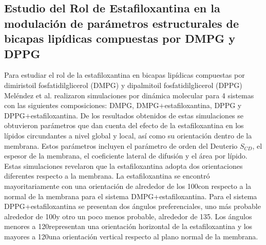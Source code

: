 \subsection{Estudio del Rol de Estafiloxantina en la modulaci\'{o}n de par\'{a}metros estructurales de bicapas lip\'{i}dicas compuestas por DMPG y DPPG  \cite{Melendez-Delgado2018StudyingBilayers}}
Para estudiar el rol de la estafiloxantina en bicapas lip\'{i}dicas compuestas por dimiristoil fosfatidilglicerol (DMPG) y dipalmitoil fosfatidilglicerol (DPPG) Mel\'{e}ndez et al. \cite{Melendez-Delgado2018StudyingBilayers} realizaron simulaciones por din\'{a}mica molecular para 4 sistemas con las siguientes composiciones: DMPG, DMPG$+$estafiloxantina, DPPG y DPPG$+$estafiloxantina. De los resultados obtenidos de estas simulaciones se obtuvieron par\'{a}metros que dan cuenta del efecto de la estafiloxantina en los l\'{i}pidos circundantes a nivel global y local, as\'{i} como su orientaci\'{o}n dentro de la membrana. Estos par\'{a}metros incluyen el par\'{a}metro de orden del Deuterio $S_{CD}$, el espesor de la membrana, el coeficiente lateral de difusi\'{o}n y el \'{a}rea por l\'{i}pido. \\

Estas simulaciones revelaron que la estafiloxantina adopta dos orientaciones diferentes respecto a la membrana. La estafiloxantina se encontr\'{o} mayoritariamente con una orientaci\'{o}n de alrededor de los 100\textdegree  con respecto a la normal de la membrana para el sistema   DMPG+estafiloxantina. Para el sistema  DPPG+estafiloxantina se presentan  dos \'{a}ngulos preferenciales,  uno m\'{a}s probable alrededor de 100\textdegree  y otro un poco menos probable, alrededor de 135\textdegree . Los \'{a}ngulos menores a 120\textdegree  representan una orientaci\'{o}n horizontal de la estafiloxantina y los mayores a 120\textdegree  una orientaci\'{o}n vertical respecto al plano normal de la membrana.\\

